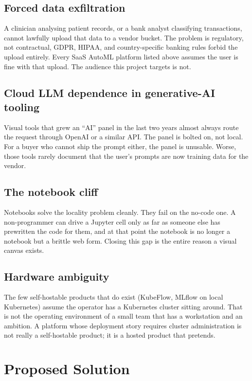 \documentclass[12pt, a4paper, oneside]{report}
\begin{document}
\subsection{Forced data exfiltration}

A clinician analysing patient records, or a bank analyst classifying
transactions, cannot lawfully upload that data to a vendor bucket.
The problem is regulatory, not contractual, GDPR, HIPAA, and
country-specific banking rules forbid the upload entirely. Every
SaaS AutoML platform listed above assumes the user is fine with that
upload. The audience this project targets is not.

\subsection{Cloud LLM dependence in generative-AI tooling}

Visual tools that grew an ``AI'' panel in the last two years almost
always route the request through OpenAI or a similar API. The panel
is bolted on, not local. For a buyer who cannot ship the prompt
either, the panel is unusable. Worse, those tools rarely document
that the user's prompts are now training data for the vendor.

\subsection{The notebook cliff}

Notebooks solve the locality problem cleanly. They fail on the
no-code one. A non-programmer can drive a Jupyter cell only as far
as someone else has prewritten the code for them, and at that point
the notebook is no longer a notebook but a brittle web form. Closing
this gap is the entire reason a visual canvas exists.

\subsection{Hardware ambiguity}

The few self-hostable products that do exist (KubeFlow, MLflow on
local Kubernetes) assume the operator has a Kubernetes cluster
sitting around. That is not the operating environment of a small
team that has a workstation and an ambition. A platform whose
deployment story requires cluster administration is not really a
self-hostable product; it is a hosted product that pretends.

\section{Proposed Solution}
\end{document}
